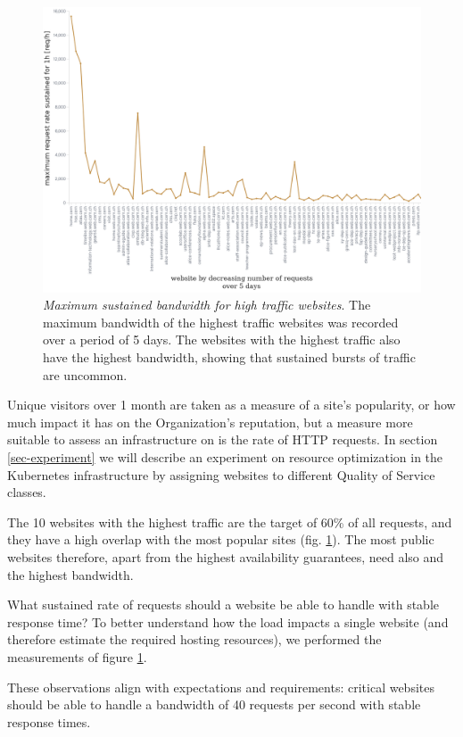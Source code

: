 \begin{figure}[b]
    \centering
    \includegraphics[width=.95\textwidth]{figures/website-bandwidth}
    \caption{\emph{Maximum sustained bandwidth for high traffic websites}.
      The maximum bandwidth of the highest traffic websites was recorded over a period of 5 days.
      The websites with the highest traffic also have the highest bandwidth, showing that sustained bursts of traffic are uncommon.}
    \label{fig:website_bandwidth}
\end{figure}

Unique visitors over 1 month are taken as a measure of a site's popularity, or how much impact it has on the Organization's reputation,
but a measure more suitable to assess an infrastructure on is the rate of HTTP requests.
In section \ref{sec-experiment} we will describe an experiment on resource optimization in the Kubernetes infrastructure
by assigning websites to different Quality of Service classes.

The 10 websites with the highest traffic are the target of 60\% of all requests, and they have a high overlap with the most popular sites (fig. \ref{fig:website_bandwidth}).
The most public websites therefore, apart from the highest availability guarantees, need also and the highest bandwidth.

What sustained rate of requests should a website be able to handle with stable response time?
To better understand how the load impacts a single website (and therefore estimate the required hosting resources),
we performed the measurements of figure \ref{fig:website_bandwidth}.

These observations align with expectations and requirements: critical websites should be able to handle a bandwidth of 40 requests per second with stable response times.